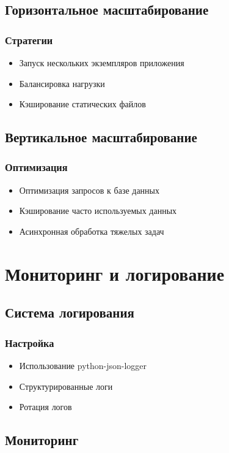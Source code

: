 \documentclass[12pt,a4paper]{article}
\begin{document}
\subsection{Горизонтальное масштабирование}
\subsubsection{Стратегии}
\begin{itemize}
    \item Запуск нескольких экземпляров приложения
    \item Балансировка нагрузки
    \item Кэширование статических файлов
\end{itemize}

\subsection{Вертикальное масштабирование}
\subsubsection{Оптимизация}
\begin{itemize}
    \item Оптимизация запросов к базе данных
    \item Кэширование часто используемых данных
    \item Асинхронная обработка тяжелых задач
\end{itemize}

\section{Мониторинг и логирование}
\subsection{Система логирования}
\subsubsection{Настройка}
\begin{itemize}
    \item Использование python-json-logger
    \item Структурированные логи
    \item Ротация логов
\end{itemize}

\subsection{Мониторинг}
\end{document}
